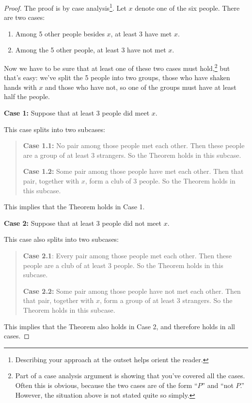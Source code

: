 \begin{proof}
The proof is by case analysis\footnote{Describing your approach at the
outset helps orient the reader.}.  Let $x$ denote one of the six
people.  There are two cases:

\begin{enumerate}
\item\label{3met} Among 5 other people besides $x$, at least 3 have met
  $x$.

\item \label{3notmet} Among the 5 other people, at least 3 have not met
  $x$.
\end{enumerate}

Now we have to be sure that at least one of these two cases must
hold,\footnote{Part of a case analysis argument is showing that you've
  covered all the cases.  Often this is obvious, because the two cases are
  of the form ``$P$'' and ``not $P$.''  However, the situation above is
  not stated quite so simply.} but that's easy: we've split the 5 people
into two groups, those who have shaken hands with $x$ and those who have
not, so one of the groups must have at least half the people.

\textbf{Case 1:}  Suppose that at least 3 people did meet $x$.

This case splits into two subcases:
\begin{quote}

\textbf{Case 1.1:} No pair among those people met each other.  Then these
people are a group of at least 3 strangers.  So the Theorem holds in this
subcase.

\textbf{Case 1.2:} Some pair among those people have met each other.
Then that pair, together with $x$, form a club of 3 people.  So the
Theorem holds in this subcase.

\end{quote}
This implies that the Theorem holds in Case 1.

\textbf{Case 2:} Suppose that at least 3 people did not meet $x$.

This case also splits into two subcases:
\begin{quote}

\textbf{Case 2.1}: Every pair among those people met each other.  Then these
people are a club of at least 3 people.   So the Theorem holds in this subcase.

\textbf{Case 2.2:} Some pair among those people have not met each other.
Then that pair, together with $x$, form a group of at least 3 strangers.
So the Theorem holds in this subcase.

\end{quote}
This implies that the Theorem also holds in Case 2, and therefore holds in
all cases.
\end{proof}

